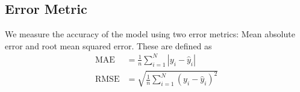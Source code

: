 \subsection{Error Metric}
We measure the accuracy of the model using two error metrics:
Mean absolute error and root mean squared error.
These are defined as
\begin{align}
  \text{MAE} &= \frac{1}{n}\sum_{i=1}^N\left|y_i - \hat{y}_i\right|\\
  \text{RMSE} &= \sqrt{\frac{1}{n}\sum_{i=1}^N\left(y_i - \hat{y}_i\right)^2}
\end{align}

